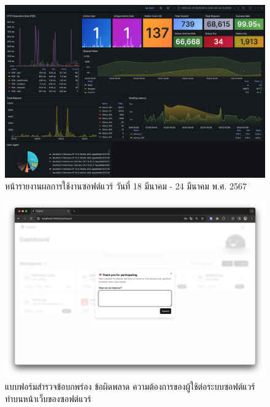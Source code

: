 \documentclass[12pt,one side,openright,a4paper]{cpe-thesis-th}
\begin{document}
\begin{figure}[H]
    \centering
    \includegraphics[width=15cm]{figure/results/grafana/grafana-mar18-mar24.png}
    \caption[หน้ารายงานผลการใช้งานซอฟต์แวร์ วันที่ 18 มีนาคม - 24 มีนาคม พ.ศ. 2567]{หน้ารายงานผลการใช้งานซอฟต์แวร์ วันที่ 18 มีนาคม - 24 มีนาคม พ.ศ. 2567}
    \label{fig:res-grafana-m18m24}
\end{figure}

\pagebreak
{}

\begin{figure}[H]
    \centering
    \includegraphics[width=15cm]{figure/results/forms/survey-web-old.png}
    \caption[แบบฟอร์มสำรวจข้อบกพร่อง ข้อผิดพลาด ความต้องการของผู้ใช้ต่อระบบซอฟต์แวร์]{แบบฟอร์มสำรวจข้อบกพร่อง ข้อผิดพลาด ความต้องการของผู้ใช้ต่อระบบซอฟต์แวร์ ทำบนหน้าเว็บของซอฟต์แวร์}
\end{figure}
\end{document}
